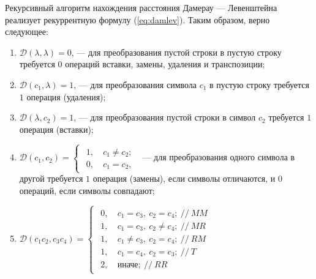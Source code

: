 Рекурсивный алгоритм нахождения расстояния Дамерау --- Левенштейна реализует рекуррентную формулу (\ref{eq:damlev}). Таким образом, верно следующее:
\begin{enumerate}
    \item $\mathcal{D}(\lambda, \lambda) = 0$, --- для преобразования пустой строки в пустую строку требуется $0$ операций вставки, замены, удаления и транспозиции;
    \item $\mathcal{D}(c_1, \lambda) = 1$, --- для преобразования символа $c_1$ в пустую строку требуется $1$ операция (удаления);
    \item $\mathcal{D}(\lambda, c_2) = 1$, --- для преобразования пустой строки в символ $c_2$ требуется $1$ операция (вставки);
    \item $\mathcal{D}(c_1, c_2) = \begin{cases}
            \begin{aligned}
                1,\ &c_1 \neq c_2; \\
                0,\ &c_1 = c_2,
            \end{aligned}
    \end{cases} $ --- для преобразования одного символа в другой требуется $1$ операция (замены), если символы отличаются, и $0$ операций, если символы совпадают;
    \item $\mathcal{D}(c_1c_2, c_3c_4) = \begin{cases}
            \begin{aligned}
                0,\ &c_1 = c_3,\ c_2 = c_4;\ //\ MM \\
                1,\ &c_1 = c_3,\ c_2 \neq c_4;\ //\ MR \\
                1,\ &c_1 \neq c_3,\ c_2 = c_4;\ //\ RM \\
                1,\ &c_1 = c_4,\ c_2 = c_3;\ //\ T \\
                2,\ &\text{иначе};\ //\ RR
            \end{aligned}
    \end{cases} $
\end{enumerate}

